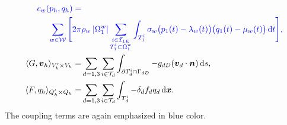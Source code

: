 {\begin{align*}
%
\color{blue}
 c_w(p_h,q_h) =& \\
 \color{blue}{ \sum_{w\in \mathcal{W}} \Bigg[2\pi}
        & \color{blue}{\rho_w\abs{\Omega^w_1} \sum_{\substack{i\in\mathcal{I}_{1E} \\ T^i_1\subset\Omega^w_1}}
        \int_{T^i_1} \sigma_w \big(p_1(t)-\lambda_w(t)\big) \big(q_1(t)-\mu_w(t)\big) \dd t} \Bigg],\\
 \langle G, \vc v_h\rangle_{V_h'\times V_h} =& \sum_{d=1,3}\sum_{i\in \mathcal T_d}
        \int_{\prtl T_d^i\cap \Gamma_{dD}}
                 - g_{dD} (\vc v_d \cdot \vc n) \dd s,\\
 \langle F, q_h\rangle_{Q_h'\times Q_h} =& \sum_{d=1,3}\sum_{i\in \mathcal T_d}%
        \int_{T_d^i} - \delta_d f_d q_d \dd\bx.
\end{align*}
}
The coupling terms are again emphasized in blue color.



% 
% 


